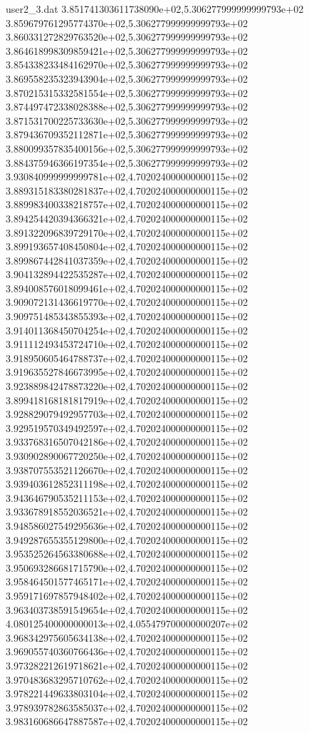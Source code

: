 \begin{filecontents}{user2_3.dat}
3.851741303611738090e+02,5.306277999999999793e+02
3.859679761295774370e+02,5.306277999999999793e+02
3.860331272829763520e+02,5.306277999999999793e+02
3.864618998309859421e+02,5.306277999999999793e+02
3.854338233484162970e+02,5.306277999999999793e+02
3.869558235323943904e+02,5.306277999999999793e+02
3.870215315332581554e+02,5.306277999999999793e+02
3.874497472338028388e+02,5.306277999999999793e+02
3.871531700225733630e+02,5.306277999999999793e+02
3.879436709352112871e+02,5.306277999999999793e+02
3.880099357835400156e+02,5.306277999999999793e+02
3.884375946366197354e+02,5.306277999999999793e+02
3.930840999999999781e+02,4.702024000000000115e+02
3.889315183380281837e+02,4.702024000000000115e+02
3.889983400338218757e+02,4.702024000000000115e+02
3.894254420394366321e+02,4.702024000000000115e+02
3.891322096839729170e+02,4.702024000000000115e+02
3.899193657408450804e+02,4.702024000000000115e+02
3.899867442841037359e+02,4.702024000000000115e+02
3.904132894422535287e+02,4.702024000000000115e+02
3.894008576018099461e+02,4.702024000000000115e+02
3.909072131436619770e+02,4.702024000000000115e+02
3.909751485343855393e+02,4.702024000000000115e+02
3.914011368450704254e+02,4.702024000000000115e+02
3.911112493453724710e+02,4.702024000000000115e+02
3.918950605464788737e+02,4.702024000000000115e+02
3.919635527846673995e+02,4.702024000000000115e+02
3.923889842478873220e+02,4.702024000000000115e+02
3.899418168181817919e+02,4.702024000000000115e+02
3.928829079492957703e+02,4.702024000000000115e+02
3.929519570349492597e+02,4.702024000000000115e+02
3.933768316507042186e+02,4.702024000000000115e+02
3.930902890067720250e+02,4.702024000000000115e+02
3.938707553521126670e+02,4.702024000000000115e+02
3.939403612852311198e+02,4.702024000000000115e+02
3.943646790535211153e+02,4.702024000000000115e+02
3.933678918552036521e+02,4.702024000000000115e+02
3.948586027549295636e+02,4.702024000000000115e+02
3.949287655355129800e+02,4.702024000000000115e+02
3.953525264563380688e+02,4.702024000000000115e+02
3.950693286681715790e+02,4.702024000000000115e+02
3.958464501577465171e+02,4.702024000000000115e+02
3.959171697857948402e+02,4.702024000000000115e+02
3.963403738591549654e+02,4.702024000000000115e+02
4.080125400000000013e+02,4.055479700000000207e+02
3.968342975605634138e+02,4.702024000000000115e+02
3.969055740360766436e+02,4.702024000000000115e+02
3.973282212619718621e+02,4.702024000000000115e+02
3.970483683295710762e+02,4.702024000000000115e+02
3.978221449633803104e+02,4.702024000000000115e+02
3.978939782863585037e+02,4.702024000000000115e+02
3.983160686647887587e+02,4.702024000000000115e+02

\end{filecontents}
